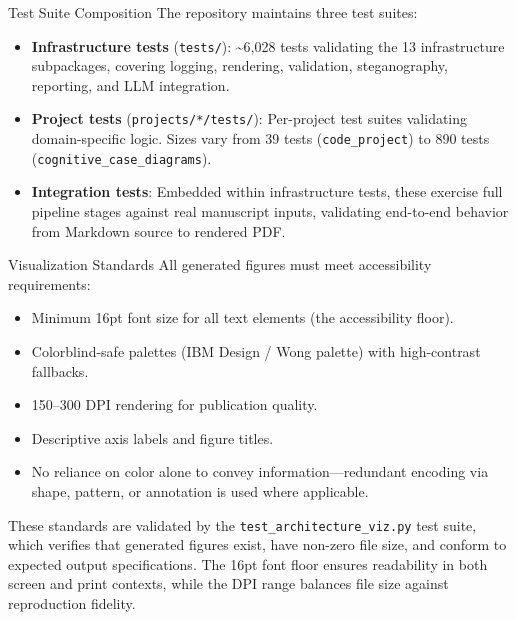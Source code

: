 \documentclass[
  ignorenonframetext,
]{beamer}
\providecommand{\tightlist}{%
  \setlength{\itemsep}{0pt}\setlength{\parskip}{0pt}}
\begin{document}
\begin{frame}[fragile]{Test Suite Composition}
\protect{}\label{test-suite-composition}
The repository maintains three test suites:

\begin{itemize}
\tightlist
\item
  \textbf{Infrastructure tests} (\texttt{tests/}): \textasciitilde6,028
  tests validating the 13 infrastructure subpackages, covering logging,
  rendering, validation, steganography, reporting, and LLM integration.
\item
  \textbf{Project tests} (\texttt{projects/*/tests/}): Per-project test
  suites validating domain-specific logic. Sizes vary from 39 tests
  (\texttt{code\_project}) to 890 tests
  (\texttt{cognitive\_case\_diagrams}).
\item
  \textbf{Integration tests}: Embedded within infrastructure tests,
  these exercise full pipeline stages against real manuscript inputs,
  validating end-to-end behavior from Markdown source to rendered PDF.
\end{itemize}
\end{frame}

\begin{frame}[fragile]{Visualization Standards}
\protect{}\label{visualization-standards}
All generated figures must meet accessibility requirements:

\begin{itemize}
\tightlist
\item
  Minimum 16pt font size for all text elements (the accessibility
  floor).
\item
  Colorblind-safe palettes (IBM Design / Wong palette) with
  high-contrast fallbacks.
\item
  150--300 DPI rendering for publication quality.
\item
  Descriptive axis labels and figure titles.
\item
  No reliance on color alone to convey information---redundant encoding
  via shape, pattern, or annotation is used where applicable.
\end{itemize}

These standards are validated by the \texttt{test\_architecture\_viz.py}
test suite, which verifies that generated figures exist, have non-zero
file size, and conform to expected output specifications. The 16pt font
floor ensures readability in both screen and print contexts, while the
DPI range balances file size against reproduction fidelity.
\end{frame}
\end{document}
